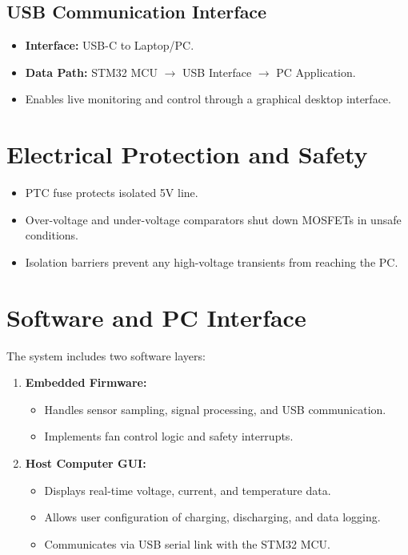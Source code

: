 \documentclass[12pt,a4paper]{article}
\begin{document}
\subsection{USB Communication Interface}
\begin{itemize}
    \item \textbf{Interface:} USB-C to Laptop/PC.
    \item \textbf{Data Path:} STM32 MCU $\rightarrow$ USB Interface $\rightarrow$ PC Application.
    \item Enables live monitoring and control through a graphical desktop interface.
\end{itemize}

\section{Electrical Protection and Safety}
\begin{itemize}
    \item PTC fuse protects isolated 5V line.
    \item Over-voltage and under-voltage comparators shut down MOSFETs in unsafe conditions.
    \item Isolation barriers prevent any high-voltage transients from reaching the PC.
\end{itemize}

\section{Software and PC Interface}
The system includes two software layers:
\begin{enumerate}
    \item \textbf{Embedded Firmware:}
    \begin{itemize}
        \item Handles sensor sampling, signal processing, and USB communication.
        \item Implements fan control logic and safety interrupts.
    \end{itemize}
    \item \textbf{Host Computer GUI:}
    \begin{itemize}
        \item Displays real-time voltage, current, and temperature data.
        \item Allows user configuration of charging, discharging, and data logging.
        \item Communicates via USB serial link with the STM32 MCU.
    \end{itemize}
\end{enumerate}
\end{document}
